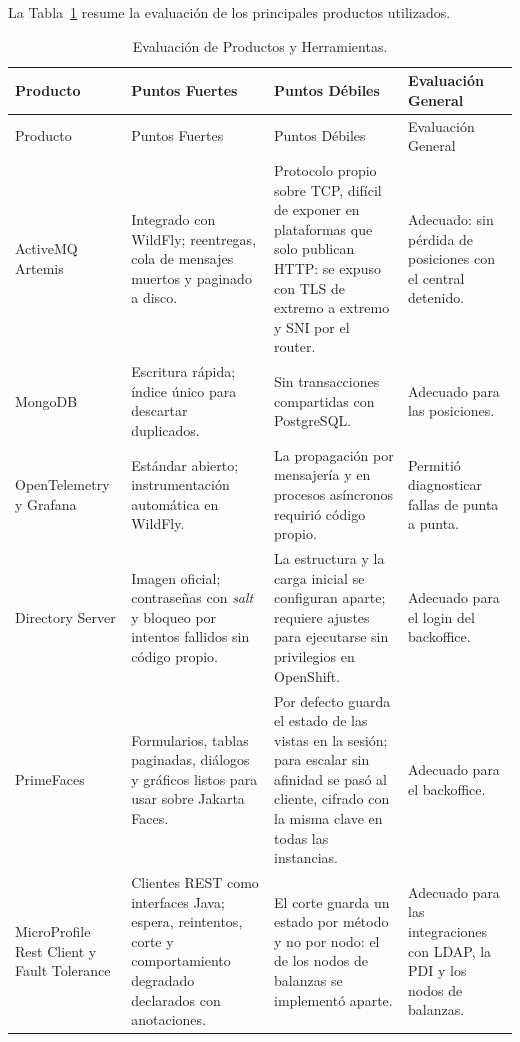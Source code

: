 La Tabla~\ref{tab:evaluacion-productos-herramientas} resume la evaluación de los principales productos utilizados.

{\small\setlength{\tabcolsep}{3pt}
\begin{longtable}{|>{\raggedright\arraybackslash}p{2.2cm}|>{\raggedright\arraybackslash}p{3.4cm}|>{\raggedright\arraybackslash}p{3.4cm}|>{\raggedright\arraybackslash}p{2.2cm}|}
\caption{Evaluación de Productos y Herramientas.}\label{tab:evaluacion-productos-herramientas}\\
\hline
    Producto &  Puntos Fuertes & Puntos Débiles & Evaluación General\\
\hline
\endfirsthead
\hline
    Producto &  Puntos Fuertes & Puntos Débiles & Evaluación General\\
\hline
\endhead
    ActiveMQ Artemis & Integrado con WildFly; reentregas, cola de mensajes muertos y paginado a disco. & Protocolo propio sobre TCP, difícil de exponer en plataformas que solo publican HTTP: se expuso con TLS de extremo a extremo y SNI por el router. & Adecuado: sin pérdida de posiciones con el central detenido. \\
\hline
    MongoDB & Escritura rápida; índice único para descartar duplicados. & Sin transacciones compartidas con PostgreSQL. & Adecuado para las posiciones. \\
\hline
    OpenTelemetry y Grafana & Estándar abierto; instrumentación automática en WildFly. & La propagación por mensajería y en procesos asíncronos requirió código propio. & Permitió diagnosticar fallas de punta a punta. \\
\hline
    389 Directory Server & Imagen oficial; contraseñas con \textit{salt} y bloqueo por intentos fallidos sin código propio. & La estructura y la carga inicial se configuran aparte; requiere ajustes para ejecutarse sin privilegios en OpenShift. & Adecuado para el login del backoffice. \\
\hline
    PrimeFaces & Formularios, tablas paginadas, diálogos y gráficos listos para usar sobre Jakarta Faces. & Por defecto guarda el estado de las vistas en la sesión; para escalar sin afinidad se pasó al cliente, cifrado con la misma clave en todas las instancias. & Adecuado para el backoffice. \\
\hline
    MicroProfile Rest Client y Fault Tolerance & Clientes REST como interfaces Java; espera, reintentos, corte y comportamiento degradado declarados con anotaciones. & El corte guarda un estado por método y no por nodo: el de los nodos de balanzas se implementó aparte. & Adecuado para las integraciones con LDAP, la PDI y los nodos de balanzas. \\

\end{longtable}}
